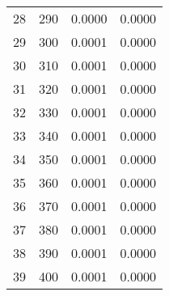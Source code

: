 \begin{table}
\begin{adjustbox}{width=1\textwidth/2}
\begin{tabular}{|c|c|c|c|}
\cline{1-4}
28 & 290 & 0.0000 & 0.0000 \\
\cline{1-4}
29 & 300 & 0.0001 & 0.0000 \\
\cline{1-4}
30 & 310 & 0.0001 & 0.0000 \\
\cline{1-4}
31 & 320 & 0.0001 & 0.0000 \\
\cline{1-4}
32 & 330 & 0.0001 & 0.0000 \\
\cline{1-4}
33 & 340 & 0.0001 & 0.0000 \\
\cline{1-4}
34 & 350 & 0.0001 & 0.0000 \\
\cline{1-4}
35 & 360 & 0.0001 & 0.0000 \\
\cline{1-4}
36 & 370 & 0.0001 & 0.0000 \\
\cline{1-4}
37 & 380 & 0.0001 & 0.0000 \\
\cline{1-4}
38 & 390 & 0.0001 & 0.0000 \\
\cline{1-4}
39 & 400 & 0.0001 & 0.0000 \\
\cline{1-4}
\end{tabular}
\end{adjustbox}
\end{table}


